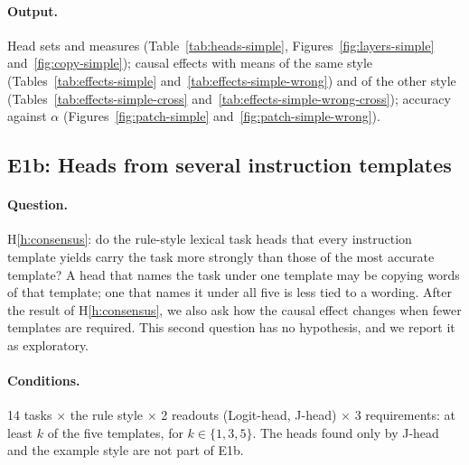 \documentclass[11pt,a4paper]{article}
\begin{document}
\paragraph{Output.} Head sets and measures (Table~\ref{tab:heads-simple}, Figures~\ref{fig:layers-simple} and~\ref{fig:copy-simple}); causal effects with means of the same style (Tables~\ref{tab:effects-simple} and~\ref{tab:effects-simple-wrong}) and of the other style (Tables~\ref{tab:effects-simple-cross} and~\ref{tab:effects-simple-wrong-cross}); accuracy against $\alpha$ (Figures~\ref{fig:patch-simple} and~\ref{fig:patch-simple-wrong}).

\subsection{E1b: Heads from several instruction templates}\label{sec:e1b}
\paragraph{Question.} H\ref{h:consensus}: do the rule-style lexical task heads that every instruction template yields carry the task more strongly than those of the most accurate template? A head that names the task under one template may be copying words of that template; one that names it under all five is less tied to a wording. After the result of H\ref{h:consensus}, we also ask how the causal effect changes when fewer templates are required. This second question has no hypothesis, and we report it as exploratory.

\paragraph{Conditions.} 14 tasks $\times$ the rule style $\times$ 2 readouts (Logit-head, J-head) $\times$ 3 requirements: at least $k$ of the five templates, for $k\in\{1,3,5\}$. The heads found only by J-head and the example style are not part of E1b.
\end{document}
